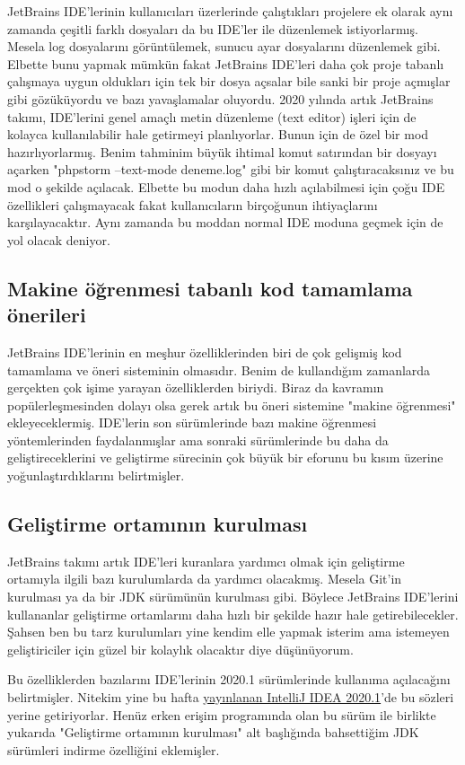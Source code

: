 \documentclass[11pt]{article}
\begin{document}
JetBrains IDE'lerinin kullanıcıları üzerlerinde çalıştıkları projelere ek
olarak aynı zamanda çeşitli farklı dosyaları da bu IDE'ler ile düzenlemek
istiyorlarmış. Mesela log dosyalarını görüntülemek, sunucu ayar dosyalarını
düzenlemek gibi. Elbette bunu yapmak mümkün fakat JetBrains IDE'leri daha çok
proje tabanlı çalışmaya uygun oldukları için tek bir dosya açsalar bile sanki
bir proje açmışlar gibi gözüküyordu ve bazı yavaşlamalar oluyordu. 2020
yılında artık JetBrains takımı, IDE'lerini genel amaçlı metin düzenleme (text
editor) işleri için de kolayca kullanılabilir hale getirmeyi planlıyorlar.
Bunun için de özel bir mod hazırlıyorlarmış. Benim tahminim büyük ihtimal
komut satırından bir dosyayı açarken "phpstorm --text-mode deneme.log" gibi
bir komut çalıştıracaksınız ve bu mod o şekilde açılacak. Elbette bu modun
daha hızlı açılabilmesi için çoğu IDE özellikleri çalışmayacak fakat
kullanıcıların birçoğunun ihtiyaçlarını karşılayacaktır. Aynı zamanda bu
moddan normal IDE moduna geçmek için de yol olacak deniyor.
\subsection{Makine öğrenmesi tabanlı kod tamamlama önerileri}
\label{sec:org19d4c4b}
JetBrains IDE'lerinin en meşhur özelliklerinden biri de çok gelişmiş kod
tamamlama ve öneri sisteminin olmasıdır. Benim de kullandığım zamanlarda
gerçekten çok işime yarayan özelliklerden biriydi. Biraz da kavramın
popülerleşmesinden dolayı olsa gerek artık bu öneri sistemine "makine
öğrenmesi" ekleyeceklermiş. IDE'lerin son sürümlerinde bazı makine öğrenmesi
yöntemlerinden faydalanmışlar ama sonraki sürümlerinde bu daha da
geliştireceklerini ve geliştirme sürecinin çok büyük bir eforunu bu kısım
üzerine yoğunlaştırdıklarını belirtmişler.
\subsection{Geliştirme ortamının kurulması}
\label{sec:org09390cc}
JetBrains takımı artık IDE'leri kuranlara yardımcı olmak için geliştirme
ortamıyla ilgili bazı kurulumlarda da yardımcı olacakmış. Mesela Git'in
kurulması ya da bir JDK sürümünün kurulması gibi. Böylece JetBrains
IDE'lerini kullananlar geliştirme ortamlarını daha hızlı bir şekilde hazır
hale getirebilecekler. Şahsen ben bu tarz kurulumları yine kendim elle yapmak
isterim ama istemeyen geliştiriciler için güzel bir kolaylık olacaktır diye
düşünüyorum.

Bu özelliklerden bazılarını IDE'lerinin 2020.1 sürümlerinde kullanıma
açılacağını belirtmişler. Nitekim yine bu hafta \href{https://blog.jetbrains.com/idea/2020/01/intellij-idea-2020-1-eap/}{yayınlanan IntelliJ IDEA
2020.1}'de bu sözleri yerine getiriyorlar. Henüz erken erişim programında olan
bu sürüm ile birlikte yukarıda "Geliştirme ortamının kurulması" alt başlığında
bahsettiğim JDK sürümleri indirme özelliğini eklemişler.
\end{document}
